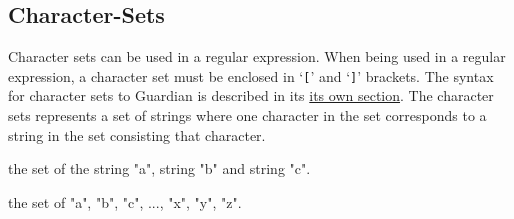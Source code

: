 
\subsection{Character-Sets}
{
	Character sets can be used in a regular expression.
	When being used in a regular expression, a character set must be enclosed in
	`\texttt{[}' and `\texttt{]}' brackets.
	The syntax for character sets to Guardian is described in its
	\hyperref[sec:charset]{its own section}.
	The character sets represents a set of strings where one character
	in the set corresponds to a string in the set consisting that character.
	
	\begin{itemize}
	{
		\item[\texttt{[`a', `b', `c']}] the set of the string "a", string
			"b" and string "c".
		\item[\texttt{[`a' - `z']}] the set of "a", "b", "c", ..., "x", "y", "z".
	}
	\end{itemize}
	
}
